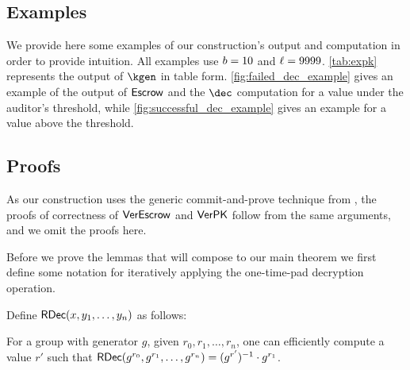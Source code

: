 \subsection{Examples}
We provide here some examples of our construction's output and computation in order to provide intuition.
All examples use $b = 10$ and $\ell = 9999$.
\cref{tab:expk} represents the output of $\kgen$ in table form.
\cref{fig:failed_dec_example} gives an example of the output of ${\sf Escrow}$ and the $\dec$ computation for a value under the auditor's threshold, while \cref{fig:successful_dec_example} gives an example for a value above the threshold.





\FloatBarrier
\subsection{Proofs}
As our construction uses the generic commit-and-prove technique from \cite{EC:KohLysNgu23}, the proofs of correctness of ${\sf VerEscrow}$ and ${\sf VerPK}$ follow from the same arguments, and we omit the proofs here.

Before we prove the lemmas that will compose to our main theorem we first define some notation for iteratively applying the one-time-pad decryption operation.

Define $\mathsf{RDec}(x, y_1,\dots,y_n)$ as follows:

\begin{lemma}
	\label{lemma:rdecchain}
	For a group with generator $g$, given $r_0, r_1, \dots, r_n$, one can efficiently compute a value $r'$ such that $\mathsf{RDec}(g^{r_0}, g^{r_1}, \dots, g^{r_n}) = (g^{r'})^{-1}\cdot g^{r_1}$.
\end{lemma}


